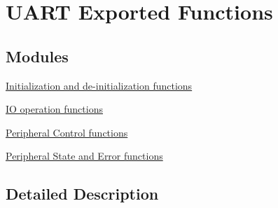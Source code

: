 \hypertarget{group___u_a_r_t___exported___functions}{}\section{U\+A\+RT Exported Functions}
\label{group___u_a_r_t___exported___functions}
\subsection*{Modules}
\begin{DoxyCompactItemize}
\item 
\hyperlink{group___u_a_r_t___exported___functions___group1}{Initialization and de-\/initialization functions}
\item 
\hyperlink{group___u_a_r_t___exported___functions___group2}{I\+O operation functions}
\item 
\hyperlink{group___u_a_r_t___exported___functions___group3}{Peripheral Control functions}
\item 
\hyperlink{group___u_a_r_t___exported___functions___group4}{Peripheral State and Error functions}
\end{DoxyCompactItemize}


\subsection{Detailed Description}
